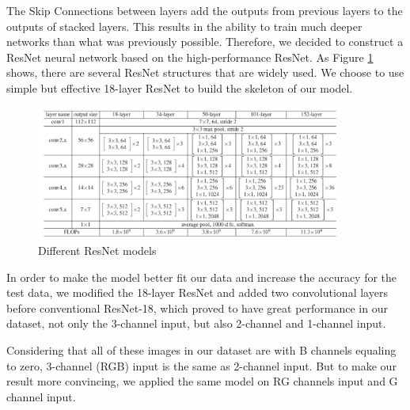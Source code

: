 \documentclass[12pt]{article}
\begin{document}
\par The Skip Connections between layers add the outputs from previous layers to the outputs of stacked layers. This results in the ability to train much deeper networks than what was previously possible. Therefore, we decided to construct a ResNet neural network based on the high-performance ResNet. As Figure \ref{model} shows, there are several ResNet structures that are widely used. We choose to use simple but effective 18-layer ResNet to build the skeleton of our model.
\begin{figure}[h]
\centering
\includegraphics[width=0.9\textwidth]{model.png}
\caption{Different ResNet models}
\label{model}
\end{figure}
\par In order to make the model better fit our data and increase the accuracy for the test data, we modified the 18-layer ResNet and added two convolutional layers before conventional ResNet-18, which proved to have great performance in our dataset, not only the 3-channel input, but also 2-channel and 1-channel input.
\par Considering that all of these images in our dataset are with B channels equaling to zero, 3-channel (RGB) input is the same as 2-channel input. But to make our result more convincing, we applied the same model on RG channels input and G channel input.
\end{document}
